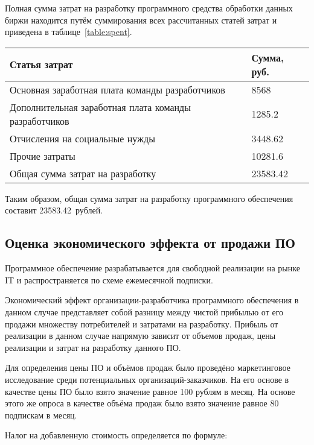 Полная сумма затрат на разработку программного средства обработки данных биржи находится путём суммирования всех рассчитанных статей затрат и приведена в таблице~\ref{table:spent}.

\begin{small}
\begin{tabularx}{\textwidth}{|X|p{}|}
    \caption{Затраты на разработку программного обеспечения}\label{table:spent}\\
    \hline
    Статья затрат & Сумма, руб. \\
    \hline
    Основная заработная плата команды разработчиков & 8568 \\
    \hline
    Дополнительная заработная плата команды разработчиков & 1285.2 \\
    \hline
    Отчисления на социальные нужды & 3448.62 \\
    \hline
    Прочие затраты & 10281.6 \\
    \hline
    Общая сумма затрат на разработку & 23583.42 \\
    \hline
\end{tabularx}
\end{small}

Таким образом, общая сумма затрат на разработку программного обеспечения составит 23583.42~рублей.

\subsection{Оценка экономического эффекта от продажи ПО}

Программное обеспечение разрабатывается для свободной реализации на рынке IT и распространяется по схеме ежемесячной подписки.

Экономический эффект организации-разработчика программного обеспечения в данном случае представляет собой разницу между чистой прибылью от его продажи множеству потребителей и затратами на разработку. Прибыль от реализации в данном случае напрямую зависит от объемов продаж, цены реализации и затрат на разработку данного ПО. 

Для определения цены ПО и объёмов продаж было проведёно маркетинговое исследование среди потенциальных организаций-заказчиков. На его основе в качестве цены ПО было взято значение равное 100 рублям в месяц. На основе этого же опроса в качестве объёма продаж было взято значение равное 80 подпискам в месяц.

Налог на добавленную стоимость определяется по формуле:

